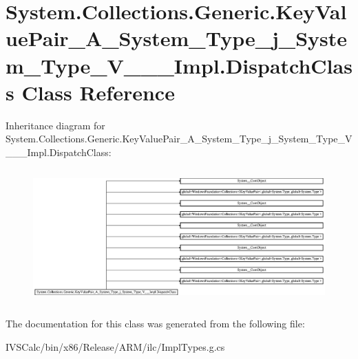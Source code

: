 \hypertarget{class_system_1_1_collections_1_1_generic_1_1_key_value_pair___a___system___type__j___system___tyee34808e544a496dcee44672e83d7a31}{}\section{System.\+Collections.\+Generic.\+Key\+Value\+Pair\+\_\+\+A\+\_\+\+System\+\_\+\+Type\+\_\+j\+\_\+\+System\+\_\+\+Type\+\_\+\+V\+\_\+\+\_\+\+\_\+\+Impl.\+Dispatch\+Class Class Reference}
\label{class_system_1_1_collections_1_1_generic_1_1_key_value_pair___a___system___type__j___system___tyee34808e544a496dcee44672e83d7a31}
Inheritance diagram for System.\+Collections.\+Generic.\+Key\+Value\+Pair\+\_\+\+A\+\_\+\+System\+\_\+\+Type\+\_\+j\+\_\+\+System\+\_\+\+Type\+\_\+\+V\+\_\+\+\_\+\+\_\+\+Impl.\+Dispatch\+Class\+:\begin{figure}[H]
\begin{center}
\leavevmode
\includegraphics[height=5.220339cm]{class_system_1_1_collections_1_1_generic_1_1_key_value_pair___a___system___type__j___system___tyee34808e544a496dcee44672e83d7a31}
\end{center}
\end{figure}


The documentation for this class was generated from the following file\+:\begin{DoxyCompactItemize}
\item 
I\+V\+S\+Calc/bin/x86/\+Release/\+A\+R\+M/ilc/Impl\+Types.\+g.\+cs\end{DoxyCompactItemize}
